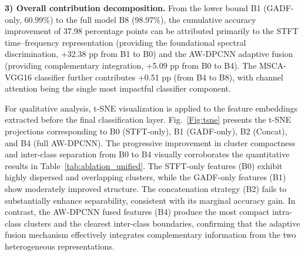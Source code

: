 \documentclass[journal]{IEEEtran}
\begin{document}
\textbf{3) Overall contribution decomposition.} From the lower bound B1 (GADF-only, 60.99\%) to the full model B8 (98.97\%), the cumulative accuracy improvement of 37.98 percentage points can be attributed primarily to the STFT time--frequency representation (providing the foundational spectral discrimination, +32.38 pp from B1 to B0) and the AW-DPCNN adaptive fusion (providing complementary integration, +5.09 pp from B0 to B4). The MSCA-VGG16 classifier further contributes +0.51 pp (from B4 to B8), with channel attention being the single most impactful classifier component.

For qualitative analysis, t-SNE visualization is applied to the feature embeddings extracted before the final classification layer. Fig.~\ref{Fig:tsne} presents the t-SNE projections corresponding to B0 (STFT-only), B1 (GADF-only), B2 (Concat), and B4 (full AW-DPCNN). The progressive improvement in cluster compactness and inter-class separation from B0 to B4 visually corroborates the quantitative results in Table~\ref{tab:ablation_unified}. The STFT-only features (B0) exhibit highly dispersed and overlapping clusters, while the GADF-only features (B1) show moderately improved structure. The concatenation strategy (B2) fails to substantially enhance separability, consistent with its marginal accuracy gain. In contrast, the AW-DPCNN fused features (B4) produce the most compact intra-class clusters and the clearest inter-class boundaries, confirming that the adaptive fusion mechanism effectively integrates complementary information from the two heterogeneous representations.
\end{document}
